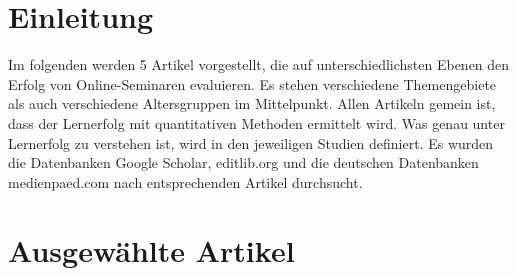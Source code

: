 \documentclass[12pt, bibliography=totoc]{scrartcl}
\begin{document}

\tableofcontents
\listoftables
\setcounter{page}{1}
\pagebreak
\section{Einleitung}\label{einleitung}

Im folgenden werden 5 Artikel vorgestellt, die auf unterschiedlichsten
Ebenen den Erfolg von Online-Seminaren evaluieren. Es stehen
verschiedene Themengebiete als auch verschiedene Altersgruppen im
Mittelpunkt. Allen Artikeln gemein ist, dass der Lernerfolg mit
quantitativen Methoden ermittelt wird. Was genau unter Lernerfolg zu
verstehen ist, wird in den jeweiligen Studien definiert. Es wurden die
Datenbanken Google Scholar, editlib.org und die deutschen Datenbanken
medienpaed.com nach entsprechenden Artikel durchsucht.

\section{Ausgewählte Artikel}\label{ausgewuxe4hlte-artikel}

\textbf{}
\end{document}
